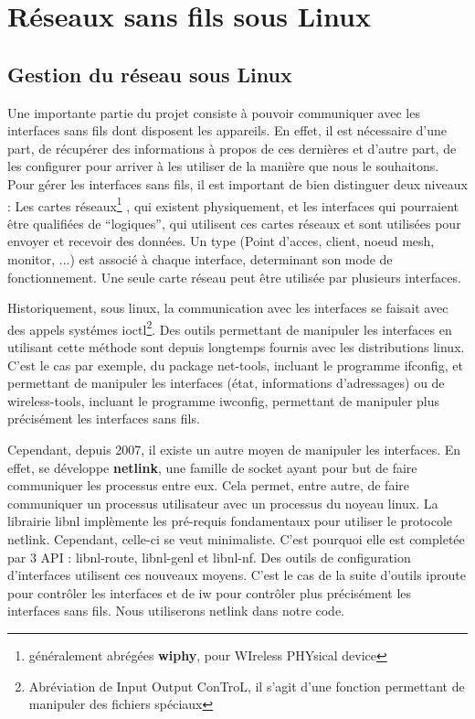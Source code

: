 \chapter{Réseaux sans fils sous Linux}
\section{Gestion du réseau sous Linux}

Une importante partie du projet consiste à pouvoir communiquer avec les interfaces sans fils dont disposent les appareils. En effet,
il est nécessaire d'une part, de récupérer des informations à propos de ces dernières et d'autre part, de les configurer pour
arriver à les utiliser de la manière que nous le souhaitons. Pour gérer les interfaces sans fils, il est important de bien
distinguer deux niveaux : Les cartes réseaux\footnote{généralement abrégées \textbf{wiphy}, pour WIreless PHYsical device} , 
qui existent physiquement, et les interfaces qui pourraient être qualifiées de ``logiques'', qui utilisent ces cartes réseaux et 
sont utilisées pour envoyer et recevoir des données. Un type (Point d'acces, client, noeud mesh, monitor, ...) est associé à chaque 
interface, determinant son mode de fonctionnement. Une seule carte réseau peut être utilisée par plusieurs interfaces.

Historiquement, sous linux, la communication avec les interfaces se faisait avec des appels systémes ioctl\footnote{Abréviation
de Input Output ConTroL, il s'agit d'une fonction permettant de manipuler des fichiers spéciaux}. Des outils permettant de
manipuler les interfaces en utilisant cette méthode sont depuis longtemps fournis avec les distributions linux. C'est le cas par
exemple, du package net-tools, incluant le programme ifconfig, et permettant de manipuler les interfaces (état, informations
d'adressages) ou de wireless-tools, incluant le programme iwconfig, permettant de manipuler plus précisément les interfaces 
sans fils.

Cependant, depuis 2007, il existe un autre moyen de manipuler les interfaces. En effet, se développe \textbf{netlink}, une
famille de socket ayant pour but de faire communiquer les processus entre eux. Cela permet, entre autre, de faire communiquer
un processus utilisateur avec un processus du noyeau linux. La librairie libnl implèmente les pré-requis fondamentaux pour 
utiliser le protocole netlink. Cependant, celle-ci se veut minimaliste. C'est pourquoi elle est completée par 3 API : libnl-route,
libnl-genl et libnl-nf\cite{NLlibs}. Des outils de configuration d'interfaces utilisent ces nouveaux moyens. C'est le cas de 
la suite d'outils iproute pour contrôler les interfaces et de iw pour contrôler plus précisément les interfaces sans fils. Nous 
utiliserons netlink dans notre code.

